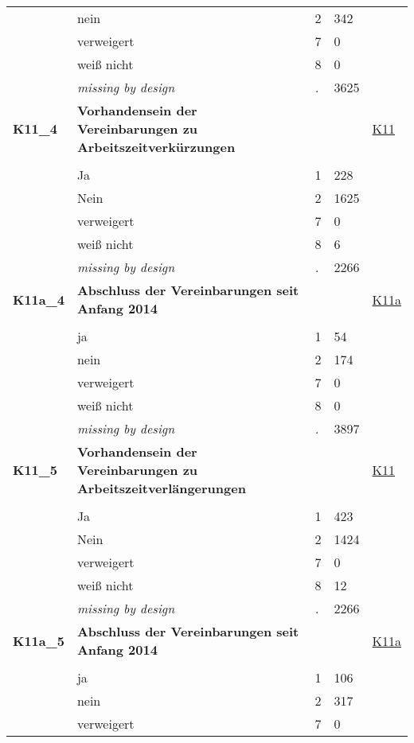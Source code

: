 \begin{longtable}{| L{2.65cm} | L{8cm} | C{1.5cm} | R{1.25cm} | C{2.25cm}  |}
   & nein & 2 & 342 &  \\ 
   & verweigert & 7 & 0 &  \\ 
   & weiß nicht & 8 & 0 &  \\ 
   & \textit{missing by design} & \textit{.} & 3625 &  \\ 
   \midrule
\textbf{K11\_4}\label{var:K11:4} & \textbf{Vorhandensein der Vereinbarungen zu Arbeitszeitverkürzungen} &  &  & \hyperref[K11]{K11} \\ 
   &  &  &  &  \\ 
   & Ja & 1 & 228 &  \\ 
   & Nein & 2 & 1625 &  \\ 
   & verweigert & 7 & 0 &  \\ 
   & weiß nicht & 8 & 6 &  \\ 
   & \textit{missing by design} & \textit{.} & 2266 &  \\ 
   \midrule
\textbf{K11a\_4}\label{var:K11a:4} & \textbf{Abschluss der Vereinbarungen seit Anfang 2014} &  &  & \hyperref[K11a]{K11a} \\ 
   &  &  &  &  \\ 
   & ja & 1 & 54 &  \\ 
   & nein & 2 & 174 &  \\ 
   & verweigert & 7 & 0 &  \\ 
   & weiß nicht & 8 & 0 &  \\ 
   & \textit{missing by design} & \textit{.} & 3897 &  \\ 
   \midrule
\textbf{K11\_5}\label{var:K11:5} & \textbf{Vorhandensein der Vereinbarungen zu Arbeitszeitverlängerungen} &  &  & \hyperref[K11]{K11} \\ 
   &  &  &  &  \\ 
   & Ja & 1 & 423 &  \\ 
   & Nein & 2 & 1424 &  \\ 
   & verweigert & 7 & 0 &  \\ 
   & weiß nicht & 8 & 12 &  \\ 
   & \textit{missing by design} & \textit{.} & 2266 &  \\ 
   \midrule
\textbf{K11a\_5}\label{var:K11a:5} & \textbf{Abschluss der Vereinbarungen seit Anfang 2014} &  &  & \hyperref[K11a]{K11a} \\ 
   &  &  &  &  \\ 
   & ja & 1 & 106 &  \\ 
   & nein & 2 & 317 &  \\ 
   & verweigert & 7 & 0 &  \\ 

\end{longtable}

